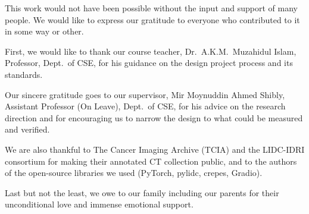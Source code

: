 
This work would not have been possible without the input and support of many people. We would like to express our gratitude to everyone who contributed to it in some way or other.

First, we would like to thank our course teacher, Dr.\ A.K.M.\ Muzahidul Islam, Professor, Dept.\ of CSE, for his guidance on the design project process and its standards.

Our sincere gratitude goes to our supervisor, Mir Moynuddin Ahmed Shibly, Assistant Professor (On Leave), Dept.\ of CSE, for his advice on the research direction and for encouraging us to narrow the design to what could be measured and verified.

We are also thankful to The Cancer Imaging Archive (TCIA) and the LIDC-IDRI consortium for making their annotated CT collection public, and to the authors of the open-source libraries we used (PyTorch, pylidc, crepes, Gradio).

Last but not the least, we owe to our family including our parents for their unconditional love and immense emotional support.
